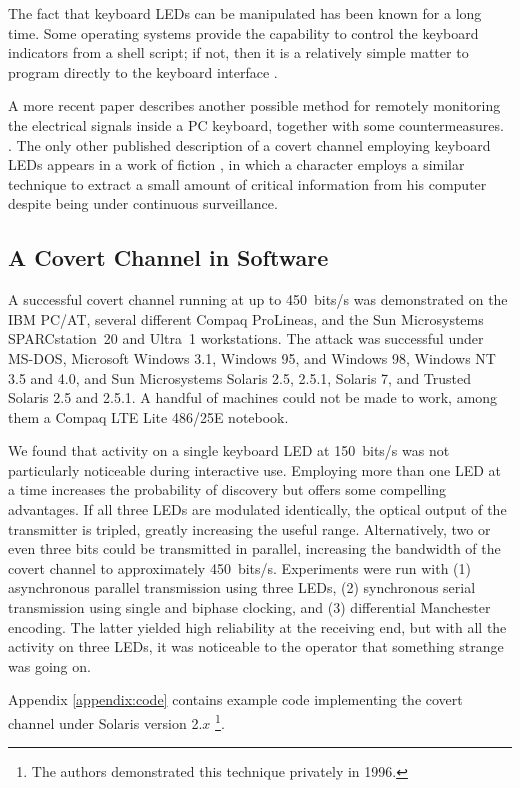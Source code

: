 \documentclass{acmtrans2e}
\begin{document}
The fact that keyboard LEDs can be manipulated has been known for a long
time.  Some operating systems provide
the capability to control the keyboard indicators from a shell script; if 
not, then it is a relatively simple matter to program directly to the 
keyboard interface \cite{van_gilluwe}.

A more recent paper describes another possible method for remotely monitoring
the electrical signals inside a PC keyboard, together with some
countermeasures. \cite{nato_soft_tempest}.
The only other published description of a covert channel employing keyboard
LEDs appears in a work of fiction \cite{cryptonomicon}, in which a character
employs a similar 
technique to extract a small amount of critical information from his 
computer despite being under continuous surveillance.

\subsection{A Covert Channel in Software }

A successful covert channel running at up to 450~bits/s was
demonstrated on the IBM PC/AT, several different Compaq ProLineas, and
the Sun Microsystems SPARCstation~20 and 
Ultra~1 workstations.  The attack was successful under MS-DOS, Microsoft 
Windows 3.1, Windows 95, and Windows 98, Windows NT 3.5 and 4.0, and Sun
Microsystems Solaris 2.5, 2.5.1, Solaris 7, and Trusted Solaris 2.5
and 2.5.1.
A handful of machines could not be made to work, among them a Compaq
LTE Lite 486/25E notebook.

We found that activity on a single keyboard LED at 150~bits/s was not 
particularly noticeable during interactive use.  Employing more than one 
LED at a time increases the probability of discovery but offers some
compelling
advantages.  If all three LEDs are modulated identically, the optical 
output of the transmitter is tripled, greatly increasing the useful 
range.  Alternatively, two or even three bits could be transmitted in 
parallel, increasing the bandwidth of the covert channel to 
approximately 450~bits/s.  Experiments were run with (1) asynchronous parallel 
transmission using three LEDs, (2) synchronous serial transmission using
single and biphase clocking, and (3) differential Manchester 
encoding.  The latter yielded high reliability at the receiving end, but 
with all the activity on three LEDs, it was noticeable to the 
operator that something strange was going on.

Appendix \ref{appendix:code} contains example code implementing the covert
channel under Solaris version 2.$x$
\footnote{The authors demonstrated this technique privately in 1996.}.
\end{document}
